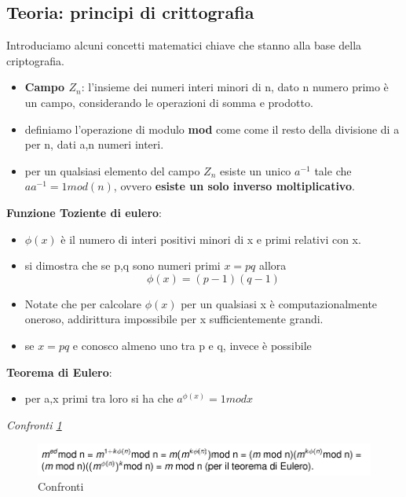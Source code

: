 \documentclass[12pt]{article}
\begin{document}
		\subsection{Teoria: principi di crittografia}
			Introduciamo alcuni concetti matematici chiave che stanno alla base della criptografia.\\
			\begin{itemize}
				\item \textbf{Campo $Z_{n}$}: l'insieme dei numeri interi minori di n, dato n numero primo è un campo, considerando le operazioni di somma e prodotto.
				\item definiamo l'operazione di modulo \textbf{mod} come come il resto della divisione di a per n, dati a,n numeri interi.
				\item per un qualsiasi elemento del campo $Z_{n}$ esiste un unico $a^{-1}$ tale che $aa^{-1} = 1mod(n)$, ovvero \textbf{esiste un solo inverso moltiplicativo}.
			\end{itemize}
			\textbf{Funzione Toziente di eulero}:
			\begin{itemize}
				\item 	$\phi(x)$ è il numero di interi positivi minori di x e primi relativi con x.
				\item si dimostra che se p,q sono numeri primi $x=pq$ allora
				$$\phi(x)= (p-1)(q-1) $$
				\item Notate che per calcolare $\phi(x)$ per un qualsiasi x è computazionalmente oneroso, addirittura impossibile per x sufficientemente grandi.
				\item se $x = pq$ e conosco almeno uno tra p e q, invece è possibile
			\end{itemize}
			\textbf{Teorema di Eulero}:
			\begin{itemize}
				\item per a,x primi tra loro si ha che $a^{\phi(x)} = 1modx$
			\end{itemize}
			 
			 \textit{Confronti \ref{fig:euler}}\\
			\begin{figure}[h!]
				\centering
				\includegraphics[scale=0.60]{img/euler.PNG}
				\caption{Confronti \label{fig:euler}}
			\end{figure}\\
		
\end{document}
